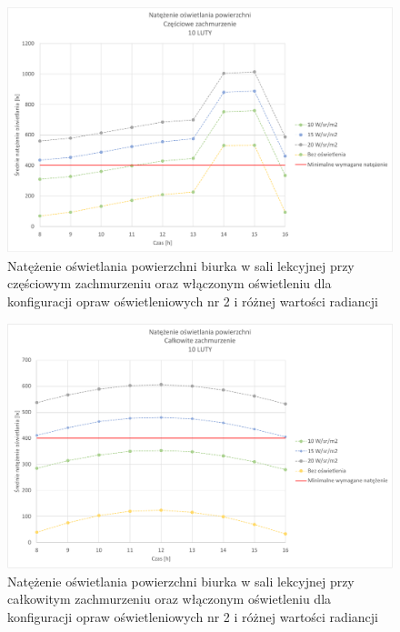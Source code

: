 \documentclass[a4paper,12pt]{article}
\begin{document}
	\begin{figure}[!ht]
		\centering
		\includegraphics[scale=0.8]{Wykresy/oswietlenie_2_czesciowe_zachmurzenie.pdf}
		\caption{Natężenie oświetlania powierzchni biurka w sali lekcyjnej przy częściowym zachmurzeniu  oraz włączonym oświetleniu dla konfiguracji opraw oświetleniowych nr 2 i różnej wartości radiancji}
		\label{oswietlenie_2_czesciowe_zachmurzenie}
	\end{figure}
	
	\begin{figure}[!ht]
		\centering
		\includegraphics[scale=0.8]{Wykresy/oswietlenie_2_calkowite_zachmurzenie.pdf}
		\caption{Natężenie oświetlania powierzchni biurka w sali lekcyjnej przy całkowitym zachmurzeniu  oraz włączonym oświetleniu dla konfiguracji opraw oświetleniowych nr 2 i różnej wartości radiancji}
		\label{oswietlenie_2_calkowite_zachmurzenie}
	\end{figure}

	\clearpage
\end{document}
